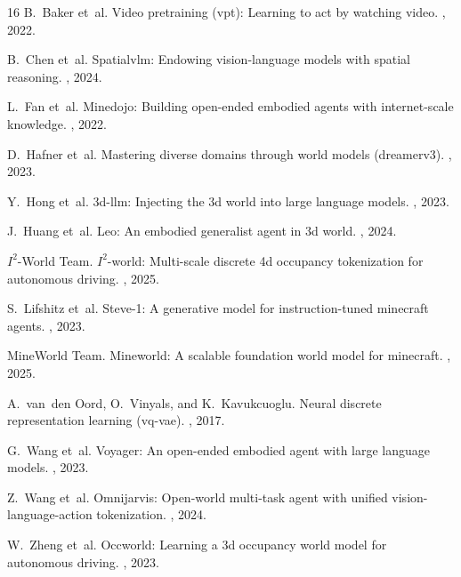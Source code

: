 \documentclass[10pt,twocolumn,letterpaper]{article}
\begin{document}
\begin{thebibliography}{16}
\small
{}
B.~Baker et~al.
\newblock Video pretraining (vpt): Learning to act by watching video.
, 2022.

B.~Chen et~al.
\newblock Spatialvlm: Endowing vision-language models with spatial reasoning.
, 2024.

L.~Fan et~al.
\newblock Minedojo: Building open-ended embodied agents with internet-scale knowledge.
, 2022.

D.~Hafner et~al.
\newblock Mastering diverse domains through world models (dreamerv3).
, 2023.

Y.~Hong et~al.
\newblock 3d-llm: Injecting the 3d world into large language models.
, 2023.

J.~Huang et~al.
\newblock Leo: An embodied generalist agent in 3d world.
, 2024.

{$I^2$-World Team}.
\newblock $I^2$-world: Multi-scale discrete 4d occupancy tokenization for autonomous driving.
, 2025.

S.~Lifshitz et~al.
\newblock Steve-1: A generative model for instruction-tuned minecraft agents.
, 2023.

{MineWorld Team}.
\newblock Mineworld: A scalable foundation world model for minecraft.
, 2025.

A.~van~den Oord, O.~Vinyals, and K.~Kavukcuoglu.
\newblock Neural discrete representation learning (vq-vae).
, 2017.

G.~Wang et~al.
\newblock Voyager: An open-ended embodied agent with large language models.
, 2023.

Z.~Wang et~al.
\newblock Omnijarvis: Open-world multi-task agent with unified vision-language-action tokenization.
, 2024.

W.~Zheng et~al.
\newblock Occworld: Learning a 3d occupancy world model for autonomous driving.
, 2023.
\end{thebibliography}
\end{document}
